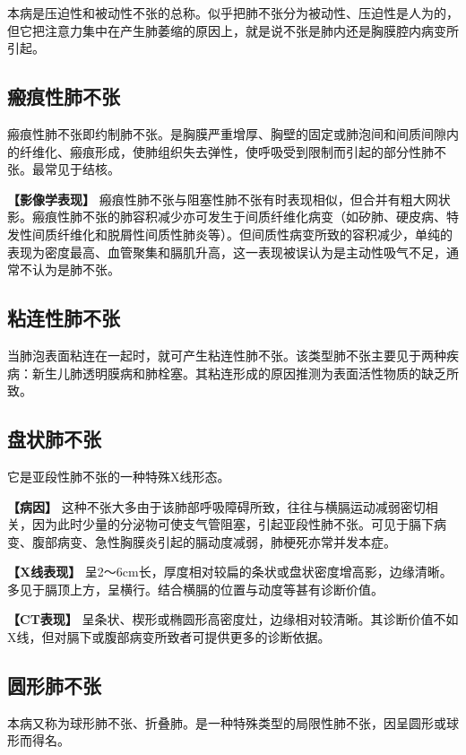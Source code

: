 本病是压迫性和被动性不张的总称。似乎把肺不张分为被动性、压迫性是人为的，但它把注意力集中在产生肺萎缩的原因上，就是说不张是肺内还是胸膜腔内病变所引起。

\subsection{瘢痕性肺不张}

瘢痕性肺不张即约制肺不张。是胸膜严重增厚、胸壁的固定或肺泡间和间质间隙内的纤维化、瘢痕形成，使肺组织失去弹性，使呼吸受到限制而引起的部分性肺不张。最常见于结核。

\textbf{【影像学表现】}
瘢痕性肺不张与阻塞性肺不张有时表现相似，但合并有粗大网状影。瘢痕性肺不张的肺容积减少亦可发生于间质纤维化病变（如矽肺、硬皮病、特发性间质纤维化和脱屑性间质性肺炎等）。但间质性病变所致的容积减少，单纯的表现为密度最高、血管聚集和膈肌升高，这一表现被误认为是主动性吸气不足，通常不认为是肺不张。

\subsection{粘连性肺不张}

当肺泡表面粘连在一起时，就可产生粘连性肺不张。该类型肺不张主要见于两种疾病：新生儿肺透明膜病和肺栓塞。其粘连形成的原因推测为表面活性物质的缺乏所致。

\subsection{盘状肺不张}

它是亚段性肺不张的一种特殊X线形态。

\textbf{【病因】}
这种不张大多由于该肺部呼吸障碍所致，往往与横膈运动减弱密切相关，因为此时少量的分泌物可使支气管阻塞，引起亚段性肺不张。可见于膈下病变、腹部病变、急性胸膜炎引起的膈动度减弱，肺梗死亦常并发本症。

\textbf{【X线表现】}
呈2～6cm长，厚度相对较扁的条状或盘状密度增高影，边缘清晰。多见于膈顶上方，呈横行。结合横膈的位置与动度等甚有诊断价值。

\textbf{【CT表现】}
呈条状、楔形或椭圆形高密度灶，边缘相对较清晰。其诊断价值不如X线，但对膈下或腹部病变所致者可提供更多的诊断依据。

\subsection{圆形肺不张}

本病又称为球形肺不张、折叠肺。是一种特殊类型的局限性肺不张，因呈圆形或球形而得名。

